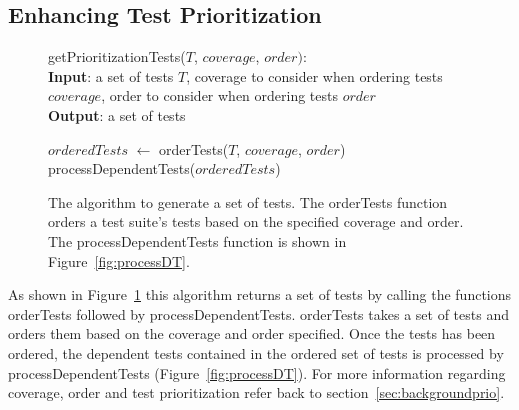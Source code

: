 \subsection{Enhancing Test Prioritization}
\label{sec:enhanceprio}
\begin{figure}[t]
	getPrioritizationTests($\mathit{T}$, $\mathit{coverage}$, $\mathit{order}):$\\
	\textbf{Input}: a set of tests $\mathit{T}$, coverage to consider when ordering
	tests $\mathit{coverage}$, order to consider when ordering tests $\mathit{order}$\\
	\textbf{Output}: a set of tests\\
	 \begin{algorithmic}[1]
	 	\vspace{-5mm}
		\STATE $\mathit{orderedTests}$ $\leftarrow$ orderTests($\mathit{T}$,
		$\mathit{coverage}$, $\mathit{order}$)
		\RETURN processDependentTests($\mathit{orderedTests}$)
	\end{algorithmic}
	\vspace{-3mm}
	\caption {
		The algorithm to generate a set of tests. The orderTests function orders
		a test suite's tests based on the specified coverage and order. The
		processDependentTests function is shown in Figure~\ref{fig:processDT}.
	}
	\label{fig:prioritization}
\end{figure}
As shown in Figure~\ref{fig:prioritization} this algorithm returns a
set of tests by calling the functions orderTests followed by
processDependentTests. orderTests takes a set of tests and orders them based on
the coverage and order specified. Once the tests has been
ordered, the dependent tests contained in the ordered set of tests is processed by
processDependentTests (Figure~\ref{fig:processDT}). For more information
regarding coverage, order and test prioritization refer back to
section~\ref{sec:backgroundprio}.

